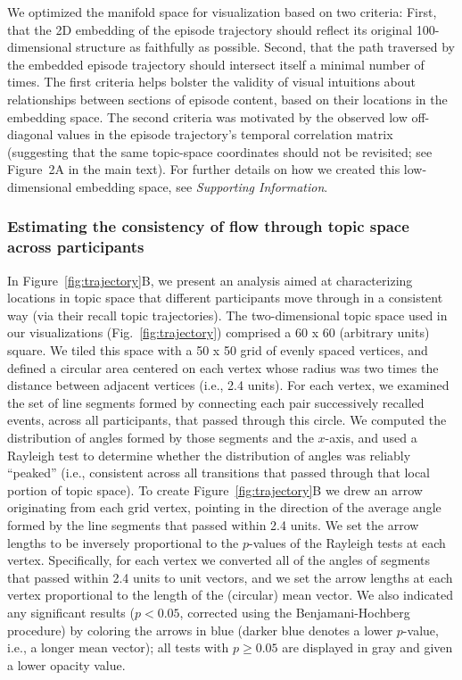 \documentclass{article}
\begin{document}
We optimized the manifold space for visualization based on two criteria: First, that the 2D embedding of the episode trajectory should reflect its original 100-dimensional structure as faithfully as possible. Second, that the path traversed by the embedded episode trajectory should intersect itself a minimal number of times.  The first criteria helps bolster the validity of visual intuitions about relationships between sections of episode content, based on their locations in the embedding space.  The second criteria was motivated by the observed low off-diagonal values in the episode trajectory's temporal correlation matrix (suggesting that the same topic-space coordinates should not be revisited; see Figure~2A in the main text). For further details on how we created this low-dimensional embedding space, see \textit{Supporting Information}.

\subsubsection*{Estimating the consistency of flow through topic space across participants}
In Figure~\ref{fig:trajectory}B, we present an analysis aimed at characterizing locations in topic space that different participants move through in a consistent way (via their recall topic trajectories).  The two-dimensional topic space used in our visualizations (Fig.~\ref{fig:trajectory}) comprised a 60 x 60 (arbitrary units) square.  We tiled this space with a 50 x 50 grid of evenly spaced vertices, and defined a circular area centered on each vertex whose radius was two times the distance between adjacent vertices (i.e., 2.4 units).  For each vertex, we examined the set of line segments formed by connecting each pair successively recalled events, across all participants, that passed through this circle.  We computed the distribution of angles formed by those segments and the $x$-axis, and used a Rayleigh test to determine whether the distribution of angles was reliably ``peaked'' (i.e., consistent across all transitions that passed through that local portion of topic space).  To create Figure~\ref{fig:trajectory}B we drew an arrow originating from each grid vertex, pointing in the direction of the average angle formed by the line segments that passed within 2.4 units.  We set the arrow lengths to be inversely proportional to the $p$-values of the Rayleigh tests at each vertex.  Specifically, for each vertex we converted all of the angles of segments that passed within 2.4 units to unit vectors, and we set the arrow lengths at each vertex proportional to the length of the (circular) mean vector.  We also indicated any significant results ($p < 0.05$, corrected using the Benjamani-Hochberg procedure) by coloring the arrows in blue (darker blue denotes a lower $p$-value, i.e., a longer mean vector); all tests with $p \geq 0.05$ are displayed in gray and given a lower opacity value.
\end{document}
